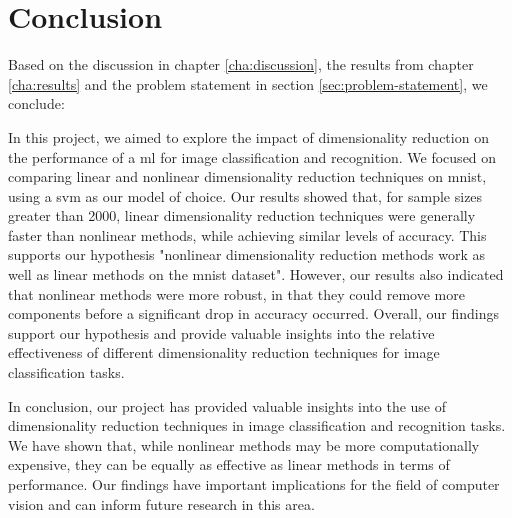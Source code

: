 \chapter{Conclusion}\label{cha:conclusion}

Based on the discussion in chapter \ref{cha:discussion}, the results from chapter \ref{cha:results} and the problem statement in section \ref{sec:problem-statement}, we conclude:


In this project, we aimed to explore the impact of dimensionality reduction on the performance of a \gls{ml} for image classification and recognition. We focused on comparing linear and nonlinear dimensionality reduction techniques on \gls{mnist}, using a \gls{svm} as our model of choice. Our results showed that, for sample sizes greater than 2000, linear dimensionality reduction techniques were generally faster than nonlinear methods, while achieving similar levels of accuracy. This supports our hypothesis "nonlinear dimensionality reduction methods work as well as linear methods on the \gls{mnist} dataset". However, our results also indicated that nonlinear methods were more robust, in that they could remove more components before a significant drop in accuracy occurred. Overall, our findings support our hypothesis and provide valuable insights into the relative effectiveness of different dimensionality reduction techniques for image classification tasks.

In conclusion, our project has provided valuable insights into the use of dimensionality reduction techniques in image classification and recognition tasks. We have shown that, while nonlinear methods may be more computationally expensive, they can be equally as effective as linear methods in terms of performance. Our findings have important implications for the field of computer vision and can inform future research in this area.

